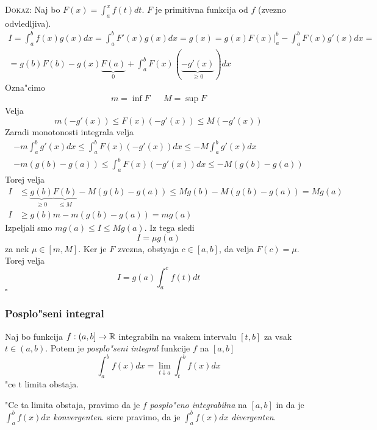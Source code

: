 \textsc{Dokaz:} Naj bo $F(x) = \int_a^x f(t) dt$. $F$ je primitivna funkcija od $f$ (zvezno odvledljiva).
\begin{gather*}
I = \int_a^b f(x) g(x) dx = \int_a^b F'(x) g(x) dx = g(x) = g(x) F(x)|_a^b - \int_a^b F(x) g'(x) dx = \\
= g(b) F(b) - g(x) \underbrace{F(a)}_0 + \int_a^b F(x) (\underbrace{-g'(x)}_{\geq 0}) dx
\end{gather*}
Ozna"cimo
\begin{align*}
m = \inf F && M = \sup F
\end{align*}
Velja
\begin{equation*}
m(-g'(x)) \leq F(x) (-g'(x)) \leq M(-g'(x))
\end{equation*}
Zaradi monotonosti integrala velja
\begin{gather*}
-m \int_a^b g'(x) dx \leq \int_a^b F(x) (-g'(x)) dx \leq -M \int_a^b g'(x) dx \\
-m (g(b) - g(a)) \leq \int_a^b F(x) (-g'(x)) dx  \leq -M (g(b) - g(a))
\end{gather*}
Torej velja
\begin{align*}
I &\leq \underbrace{g(b)}_{\geq 0} \underbrace{F(b)}_{\leq M} - M(g(b) - g(a)) \leq M g(b) - M(g(b) - g(a)) = M g(a) \\
I &\geq g(b) m - m (g(b) - g(a)) = m g(a)
\end{align*}
Izpeljali smo $mg(a) \leq I \leq M g(a)$. Iz tega sledi
\begin{equation*}
I = \mu g(a)
\end{equation*}
za nek $\mu \in [m, M]$. Ker je $F$ zvezna, obstyaja $c \in [a, b]$, da velja $F(c) = \mu$. Torej velja
\begin{equation*}
I = g(a) \int_a^c f(t)dt
\end{equation*}
\hfill $\square$

\subsubsection{Posplo"seni integral}
 Naj bo funkcija $f: (a, b] \to \mathbb{R}$ integrabiln na vsakem intervalu $[t, b]$ za vsak $t \in (a, b)$. Potem je \emph{posplo"seni integral} funkcije $f$ na $[a, b]$
\begin{equation*}
\int_a^b f(x) dx = \lim_{t \downarrow a} \int_t^b f(x) dx
\end{equation*}
"ce t limita obstaja.

"Ce ta limita obstaja, pravimo da je $f$ \emph{posplo"eno integrabilna} na $[a, b]$ in da je $\int_a^b f(x)dx$ \emph{konvergenten}. sicre pravimo, da je $\int_a^b f(x)dx$ \emph{divergenten}.

